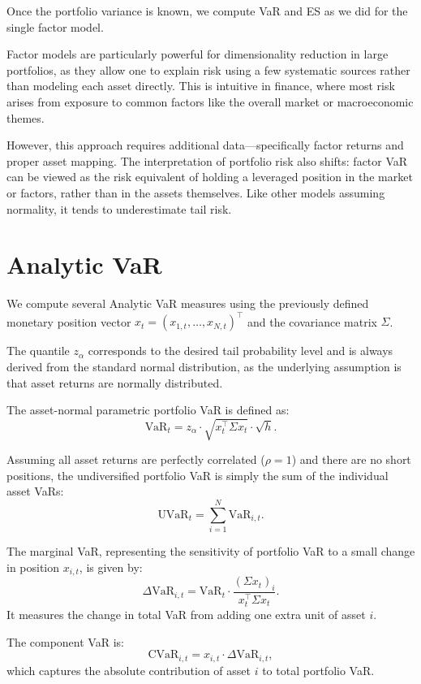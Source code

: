 \documentclass[12pt]{article}
\begin{document}
Once the portfolio variance is known, we compute VaR and ES as we did for the single factor model.

Factor models are particularly powerful for dimensionality reduction in large portfolios, as they allow one to explain risk using a few systematic sources rather than modeling each asset directly. This is intuitive in finance, where most risk arises from exposure to common factors like the overall market or macroeconomic themes.

However, this approach requires additional data—specifically factor returns and proper asset mapping. The interpretation of portfolio risk also shifts: factor VaR can be viewed as the risk equivalent of holding a leveraged position in the market or factors, rather than in the assets themselves. Like other models assuming normality, it tends to underestimate tail risk.


\section{Analytic VaR}

We compute several Analytic VaR measures using the previously defined monetary position vector \( x_t = (x_{1,t}, \dots, x_{N,t})^\top \) and the covariance matrix \( \Sigma \). 

The quantile \( z_\alpha \) corresponds to the desired tail probability level and is always derived from the standard normal distribution, as the underlying assumption is that asset returns are normally distributed.

The asset-normal parametric portfolio VaR is defined as:
\[
  \text{VaR}_t = z_\alpha \cdot \sqrt{x_t^\top \Sigma x_t} \cdot \sqrt{h}.
\]

Assuming all asset returns are perfectly correlated (\( \rho = 1 \)) and there are no short positions, the undiversified portfolio VaR is simply the sum of the individual asset VaRs:
\[
  \text{UVaR}_t = \sum_{i=1}^N \text{VaR}_{i,t}.
\]

The marginal VaR, representing the sensitivity of portfolio VaR to a small change in position \( x_{i,t} \), is given by:
\[
  \Delta \text{VaR}_{i,t} = \text{VaR}_t \cdot \frac{(\Sigma x_t)_i}{x_t^\top \Sigma x_t}.
\]
It measures the change in total VaR from adding one extra unit of asset \( i \).

The component VaR is:
\[
  \text{CVaR}_{i,t} = x_{i,t} \cdot \Delta \text{VaR}_{i,t},
\]
which captures the absolute contribution of asset \( i \) to total portfolio VaR.
\end{document}
